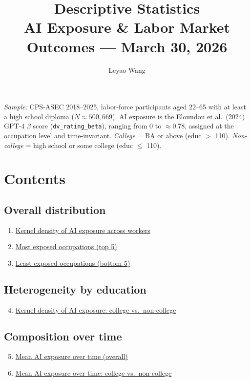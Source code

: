 \documentclass[11pt]{article}
\title{Descriptive Statistics\\
       \large AI Exposure \& Labor Market Outcomes --- March 30, 2026}
\author{Leyao Wang}
\date{}
\begin{document}
\maketitle
\thispagestyle{empty}

\noindent\textit{Sample:} CPS-ASEC 2018--2025, labor-force participants aged 22--65 with at least a high school diploma ($N\approx 500{,}669$). AI exposure is the Eloundou et al.\ (2024) GPT-4 $\beta$ score (\texttt{dv\_rating\_beta}), ranging from 0 to $\approx$0.78, assigned at the occupation level and time-invariant. \textit{College} = BA or above (educ $>$ 110). \textit{Non-college} = high school or some college (educ $\leq$ 110).

\bigskip

\section*{Contents}

\subsection*{Overall distribution}
\begin{enumerate}
  \item \hyperref[fig:kdensity_overall]{Kernel density of AI exposure across workers}
  \item \hyperref[tab:top5]{Most exposed occupations (top 5)}
  \item \hyperref[tab:bot5]{Least exposed occupations (bottom 5)}
\end{enumerate}

\subsection*{Heterogeneity by education}
\begin{enumerate}\setcounter{enumi}{3}
  \item \hyperref[fig:kdensity_educ]{Kernel density of AI exposure: college vs.\ non-college}
\end{enumerate}

\subsection*{Composition over time}
\begin{enumerate}\setcounter{enumi}{4}
  \item \hyperref[fig:beta_ts_overall]{Mean AI exposure over time (overall)}
  \item \hyperref[fig:beta_ts_educ]{Mean AI exposure over time: college vs.\ non-college}
\end{enumerate}
\end{document}
